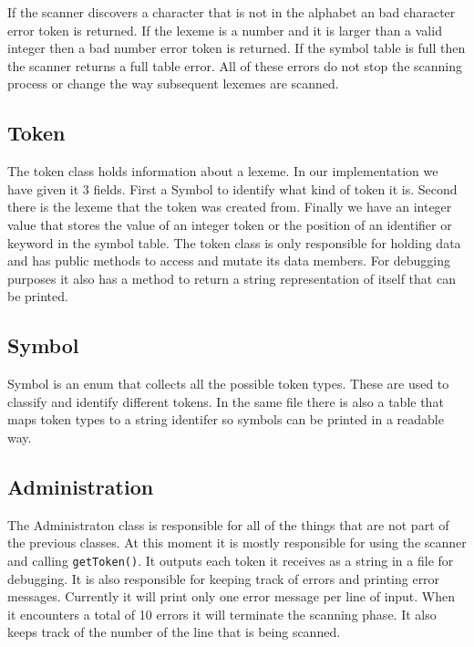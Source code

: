 \documentclass{article}
\begin{document}
If the scanner discovers a character that is not in the alphabet an bad character
error token is returned. If the lexeme is a number and it is larger than a
valid integer then a bad number error token is returned. If the symbol table
is full then the scanner returns a full table error. All of these errors do not
stop the scanning process or change the way subsequent lexemes are scanned.

\subsection{Token}
The token class holds information about a lexeme. In our implementation we have
given it 3 fields. First a Symbol to identify what kind of token it is. Second
there is the lexeme that the token was created from. Finally we have an integer
value that stores the value of an integer token or the position of an identifier
or keyword in the symbol table. The token class is only responsible for holding
data and has public methods to access and mutate its data members. For debugging
purposes it also has a method to return a string representation of itself that
can be printed.

\subsection{Symbol}
Symbol is an enum that collects all the possible token types. These are used to
classify and identify different tokens. In the same file there is also a table
that maps token types to a string identifer so symbols can be printed in a
readable way.

\subsection{Administration}
The Administraton class is responsible for all of the things that are not part
of the previous classes. At this moment it is mostly responsible for using
the scanner and calling \verb|getToken()|. It outputs each token it receives as
a string in a file for debugging. It is also responsible for keeping track of
errors and printing error messages. Currently it will print only one error message
per line of input. When it encounters a total of 10 errors it will terminate
the scanning phase. It also keeps track of the number of the line that is being scanned.
\end{document}
